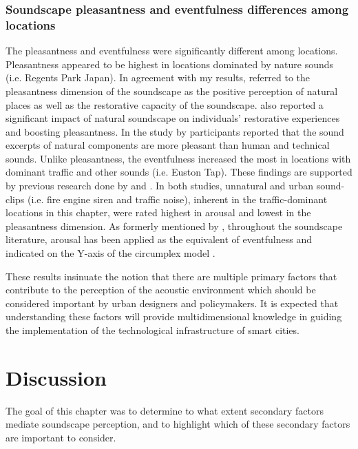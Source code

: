 \subsubsection*{Soundscape pleasantness and eventfulness differences among locations}

The pleasantness and eventfulness were significantly different among locations. Pleasantness appeared to be highest in locations dominated by nature sounds (i.e. Regents Park Japan). In agreement with my results, \citet{Payne2013production} referred to the pleasantness dimension of the soundscape as the positive perception of natural places as well as the restorative capacity of the soundscape. \citet{Zhang2014Research} also reported a significant impact of natural soundscape on individuals' restorative experiences and boosting pleasantness. In the study by \citet{Axelsson2010principal} participants reported that the sound excerpts of natural components are more pleasant than human and technical sounds. Unlike pleasantness, the eventfulness increased the most in locations with dominant traffic and other sounds (i.e. Euston Tap). These findings are supported by previous research done by \citet{Bradley2000Emotion} and \citet{Hume2013Physiological}. In both studies, unnatural and urban sound-clips (i.e. fire engine siren and traffic noise), inherent in the traffic-dominant locations in this chapter, were rated highest in arousal and lowest in the pleasantness dimension. As formerly mentioned by \citet{Erfanian2019Psychophysiological}, throughout the soundscape literature, arousal has been applied as the equivalent of eventfulness and indicated on the Y-axis of the circumplex model \citep{Axelsson2010principal,Erfanian2019Psychophysiological}.


These results insinuate the notion that there are multiple primary factors \citep{Bradley2000Emotion} that contribute to the perception of the acoustic environment which should be considered important by urban designers and policymakers. It is expected that understanding these factors will provide multidimensional knowledge in guiding the implementation of the technological infrastructure of smart cities.

\section{Discussion}
The goal of this chapter was to determine to what extent secondary factors mediate soundscape perception, and to highlight which of these secondary factors are important to consider. 


